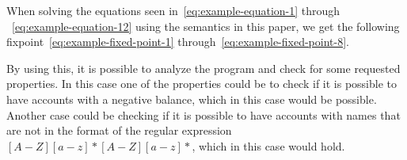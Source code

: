 When solving the equations seen in~\autoref{eq:example-equation-1} through ~\autoref{eq:example-equation-12} using the semantics in this paper, we get the following fixpoint~\autoref{eq:example-fixed-point-1} through~\autoref{eq:example-fixed-point-8}.



By using this, it is possible to analyze the program and check for some requested properties.
In this case one of the properties could be to check if it is possible to have accounts with a negative balance, which in this case would be possible.
Another case could be checking if it is possible to have accounts with names that are not in the format of the regular expression $[A-Z][a-z]* [A-Z][a-z]*$, which in this case would hold.
